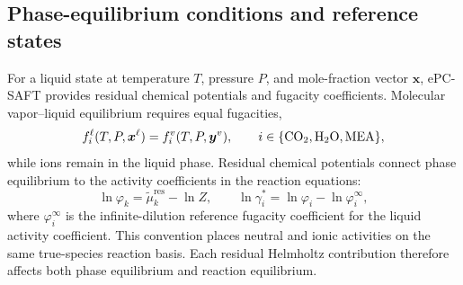\subsection{Phase-equilibrium conditions and reference states}
For a liquid state at temperature \(T\), pressure \(P\), and mole-fraction vector \(\boldsymbol{x}\), ePC-SAFT provides residual chemical potentials and fugacity coefficients.  Molecular vapor--liquid equilibrium requires equal fugacities,
\begin{equation}
    f_i^{\liq}(T,P,\boldsymbol{x}^{\liq})
    =
    f_i^{\vap}(T,P,\boldsymbol{y}^{\vap}),
    \qquad i \in \{\COtwo,\HtwoO,\MEA\},
    \label{eq:fugacity-equality}
\end{equation}
while ions remain in the liquid phase.  Residual chemical potentials connect phase equilibrium to the activity coefficients in the reaction equations:
\begin{equation}
    \ln\varphi_k
    =
    \tilde{\mu}_k^{\mathrm{res}}-\ln Z,
    \qquad
    \ln\gamma_i^{*}
    =
    \ln\varphi_i-\ln\varphi_i^{\infty},
    \label{eq:epcsaft-phi-gamma-link}
\end{equation}
where \(\varphi_i^{\infty}\) is the infinite-dilution reference fugacity coefficient for the liquid activity coefficient.  This convention places neutral and ionic activities on the same true-species reaction basis.  Each residual Helmholtz contribution therefore affects both phase equilibrium and reaction equilibrium.

